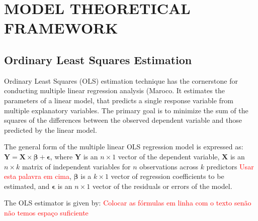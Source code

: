 \documentclass{aip-cp}
\begin{document}
\section{\uppercase{Model Theoretical Framework}}

\subsection{Ordinary Least Squares Estimation}

Ordinary Least Squares (OLS) estimation technique has the cornerstone for conducting multiple linear regression analysis (Maroco\cite{Maroco2010}. It estimates the parameters of a linear model, that predicts a single response variable from multiple explanatory variables. The primary goal is to minimize the sum of the squares of the differences between the observed dependent variable and those predicted by the linear model.

The general form of the multiple linear OLS regression model is expressed as:
$
    \mathbf{Y} = \mathbf{X}\times \boldsymbol{\beta} + \boldsymbol{\epsilon}
$,
where $\mathbf{Y}$ is an $n \times 1$ vector of the dependent variable, $\mathbf{X}$ is an $n \times k$ matrix of independent variables for $n$ observations across $k$ predictors  \textcolor{red}{Usar esta palavra em cima}, $\boldsymbol{\beta}$ is a $k \times 1$ vector of regression coefficients to be estimated, and $\boldsymbol{\epsilon}$ is an $n \times 1$ vector of the residuals or errors of the model.

The OLS estimator is given by:
%
 \textcolor{red}{Colocar as fórmulas em linha com o texto senão não temos espaço suficiente}
 
\end{document}
